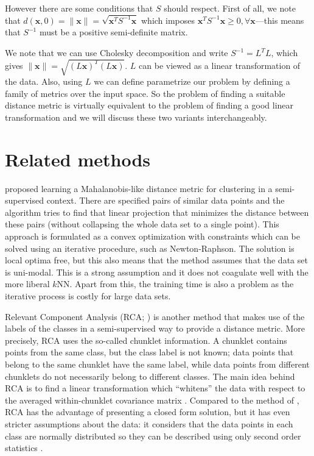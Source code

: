 However there are some conditions that $S$ should respect. First of all, we note that $d(\mathbf{x},0)=\lVert \mathbf{x}\lVert = \sqrt{\mathbf{x}^TS^{-1}\mathbf{x}}$ which imposes $\mathbf{x}^TS^{-1}\mathbf{x} \geq 0, \forall \mathbf{x}$---this means that $S^{-1}$ must be a positive semi-definite matrix. 

We note that we can use Cholesky decomposition and write $S^{-1}=L^TL$, which gives $\lVert \mathbf{x} \lVert = \sqrt{(L\mathbf{x})^T(L\mathbf{x})}$. $L$ can be viewed as a linear transformation of the data. Also, using $L$ we can define parametrize our problem by defining a family of metrics over the input space. So the problem of finding a suitable distance metric is virtually equivalent to the problem of finding a good linear transformation and we will discuss these two variants interchangeably.

\section{Related methods}

\citet{xing2003} proposed learning a Mahalanobis-like distance metric for clustering in a semi-supervised context. There are specified pairs of similar data points and the algorithm tries to find that linear projection that minimizes the distance between these pairs (without collapsing the whole data set to a single point). This approach is formulated as a convex optimization with constraints which can be solved using an iterative procedure, such as Newton-Raphson. The solution is local optima free, but this also means that the method assumes that the data set is uni-modal. This is a strong assumption and it does not coagulate well with the more liberal $k$NN. Apart from this, the training time is also a problem as the iterative process is costly for large data sets.

Relevant Component Analysis (RCA; \citealp{bar2003, shental2006}) is another method that makes use of the labels of the classes in a semi-supervised way to provide a distance metric. More precisely, RCA uses the so-called chunklet information. A chunklet contains points from the same class, but the class label is not known; data points that belong to the same chunklet have the same label, while data points from different chunklets do not necessarily belong to different classes. The main idea behind RCA is to find a linear transformation which ``whitens'' the data with respect to the averaged within-chunklet covariance matrix \citep{weinberger2009}. Compared to the method of \citet{xing2003}, RCA has the advantage of presenting a closed form solution, but it has even stricter assumptions about the data: it considers that the data points in each class are normally distributed so they can be described using only second order statistics \citep{goldberger2004}.